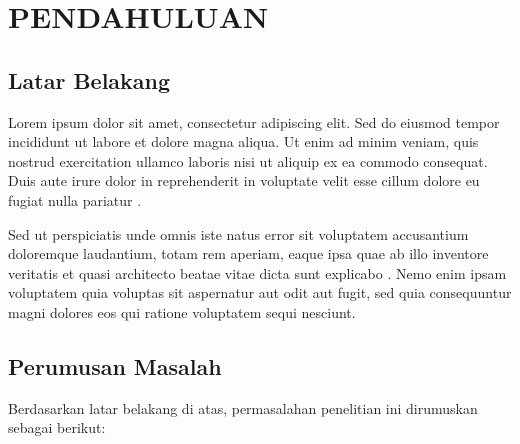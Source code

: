 \chapter{PENDAHULUAN}

\section{Latar Belakang}


Lorem ipsum dolor sit amet, consectetur adipiscing elit. Sed do eiusmod tempor incididunt ut labore et dolore magna aliqua. Ut enim ad minim veniam, quis nostrud exercitation ullamco laboris nisi ut aliquip ex ea commodo consequat. Duis aute irure dolor in reprehenderit in voluptate velit esse cillum dolore eu fugiat nulla pariatur \citep{referensi1}.

Sed ut perspiciatis unde omnis iste natus error sit voluptatem accusantium doloremque laudantium, totam rem aperiam, eaque ipsa quae ab illo inventore veritatis et quasi architecto beatae vitae dicta sunt explicabo \citep{referensi2}. Nemo enim ipsam voluptatem quia voluptas sit aspernatur aut odit aut fugit, sed quia consequuntur magni dolores eos qui ratione voluptatem sequi nesciunt.

\section{Perumusan Masalah}


Berdasarkan latar belakang di atas, permasalahan penelitian ini dirumuskan sebagai berikut:


